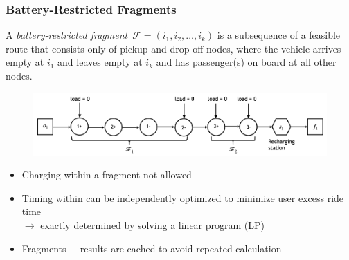 \documentclass[aspectratio=1610]{beamer}
\newcommand{\important}[1]{{\color{green!60!black}#1}}
\let\oldfootnotesize\footnotesize
\renewcommand*{\footnotesize}{\oldfootnotesize\fontsize{6}{4}\selectfont}
\renewcommand{\footnotesize}{\scriptsize}
\begin{document}
\begin{frame}
  \frametitle{Battery-Restricted Fragments} %
  
\begin{definition}
	A \important{\emph{battery-restricted fragment}}~$\mathcal{F} = (i_1, i_2, \dots, i_k)$ is a subsequence of a feasible route that consists only of \important{pickup and drop-off nodes}, where the vehicle \important{arrives empty} at $i_1$ and \important{leaves empty} at $i_k$ and has passenger(s) on board at all other nodes.
\end{definition}

\begin{figure}
	\centering
	\includegraphics[scale=0.42]{graphics/battery-restricted-fragment-example.png}
\end{figure}

\begin{itemize}
	\item Charging within a fragment not allowed
	\item Timing within can be \important{independently optimized} to \important{minimize user excess ride time}\\ %
	$\rightarrow$ exactly determined by solving a \important{linear program (LP)}
	\item Fragments + results are \important{cached} to avoid repeated calculation
\end{itemize}

\end{frame}
\end{document}
